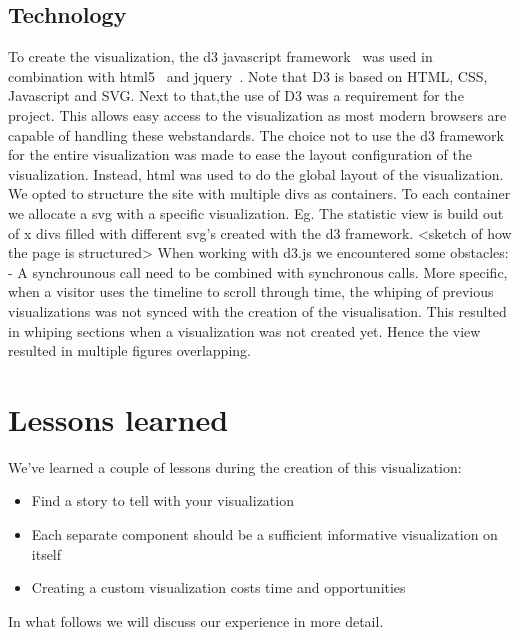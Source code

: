 \documentclass{sigchi}
\begin{document}
\subsection{Technology}
To create the visualization, the d3 javascript framework~\cite{d3.js} was used in combination with html5~\cite{html5} and jquery~\cite{jquery}.  Note that D3 is based on HTML, CSS, Javascript and SVG.
Next to that,the use of D3 was a requirement for the project. This allows easy
access to the visualization as most modern browsers are capable of handling
these webstandards. 
The choice not to use the d3 framework for the entire visualization was made to
ease the layout configuration of the visualization. Instead, html was used to do
the global layout of the visualization. We opted to structure the site with multiple
divs as containers. To each container we allocate a svg with a specific visualization.
Eg. The statistic view is build out of x divs filled with different svg's created
with the d3 framework.
<sketch of how the page is structured>
When working with d3.js we encountered some obstacles:
- A synchrounous call need to be combined with synchronous calls. More specific, when a visitor uses the timeline to scroll through time, the whiping of previous visualizations was not synced with the creation of the visualisation. This resulted in whiping sections when a visualization was not created yet. Hence the view resulted in multiple figures overlapping.


\section{Lessons learned}\label{sec:discussion}
We've learned a couple of lessons during the creation of this visualization:
\begin{itemize}
    \item Find a story to tell with your visualization
    \item Each separate component should be a sufficient informative visualization on itself
    \item Creating a custom visualization costs time and opportunities
\end{itemize}
In what follows we will discuss our experience in more detail.
\end{document}
